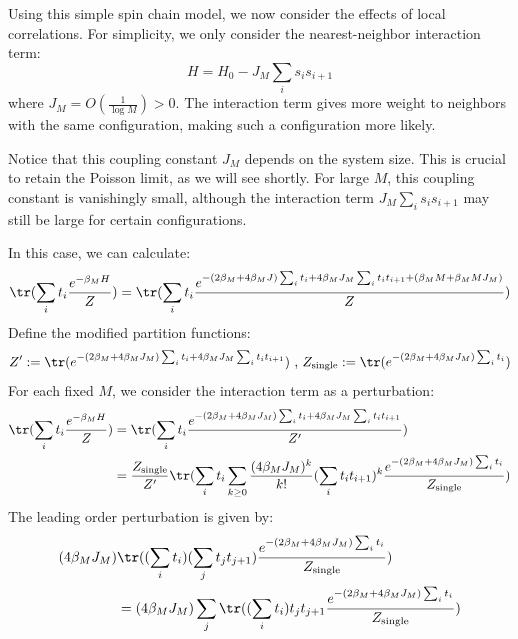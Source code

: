 \documentclass[a4paper,11pt]{article}
\theoremstyle{definition}
\numberwithin{equation}{section}
\begin{document}
Using this simple spin chain model, we now consider the effects of local correlations. For simplicity, we only consider the nearest-neighbor interaction term:
\begin{equation}
    H = H_0 - J_M\sum_i s_is_{i + 1}
\end{equation}
where $J_M  = O(\frac{1}{\log M}) > 0$. The interaction term gives more weight to neighbors with the same configuration, making such a configuration more likely.

Notice that this coupling constant $J_M$ depends on the system size. This is crucial to retain the Poisson limit, as we will see shortly. For large $M$, this coupling constant is vanishingly small, although the interaction term $J_M\sum_i s_is_{i + 1}$ may still be large for certain configurations. 

In this case, we can calculate:
\begin{equation}
    \tr(\sum_i t_i\frac{e^{-\beta_M H}}{Z})= \tr(\sum_i t_i\frac{e^{-(2\beta_M + 4\beta_M J)\sum_i t_i + 4 \beta_M J_M\sum_i t_i t_{i + 1} + (\beta_M M  + \beta_M M J_M)}}{Z})
\end{equation}
Define the modified partition functions:
\begin{equation}
    Z':=\tr(e^{-(2\beta_M + 4\beta_M J_M)\sum_i t_i + 4\beta_M J_M\sum_i t_it_{i + 1}})\text{ , }Z_\text{single} := \tr(e^{-(2\beta_M + 4\beta_M J_M)\sum_i t_i})
\end{equation}
For each fixed $M$, we consider the interaction term as a perturbation:
\begin{align}
    \begin{split}
        \tr(\sum_i t_i \frac{e^{-\beta_M H}}{Z}) &= \tr(\sum_i t_i \frac{e^{-(2\beta_M + 4\beta_M J_M)\sum_i t_i + 4\beta_M J_M\sum_i t_it_{i + 1}}}{Z'})
        \\&
        =\frac{Z_\text{single}}{Z'}\tr(\sum_i t_i\sum_{k\geq 0}\frac{(4\beta_M J_M)^k}{k!}(\sum_i t_it_{i + 1})^k\frac{e^{-(2\beta_M + 4\beta_M J_M)\sum_i t_i}}{Z_\text{single}})
    \end{split}
\end{align}
The leading order perturbation is given by:
\begin{align}
    \begin{split}
        (4\beta_M J_M)&\tr((\sum_i t_i)(\sum_j t_jt_{j + 1})\frac{e^{-(2\beta_M + 4\beta_M
        J_M)\sum_i t_i}}{Z_\text{single}}) 
        \\& = (4\beta_M J_M)\sum_j\tr((\sum_i t_i)t_jt_{j + 1}\frac{e^{-(2\beta_M + 4\beta_M J_M)\sum_it_i}}{Z_\text{single}})
    \end{split}
\end{align}
\end{document}
